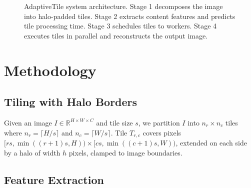 \documentclass[acmsmall]{acmart}
\begin{document}
\begin{figure}[t]
  \caption{AdaptiveTile system architecture. Stage 1 decomposes the image into halo-padded tiles. Stage 2 extracts content features and predicts tile processing time. Stage 3 schedules tiles to workers. Stage 4 executes tiles in parallel and reconstructs the output image.}
  \label{fig:architecture}
\end{figure}

\section{Methodology}
\label{sec:methodology}

\subsection{Tiling with Halo Borders}

Given an image $I \in \mathbb{R}^{H \times W \times C}$ and tile size $s$, we partition $I$ into $n_r \times n_c$ tiles where $n_r = \lceil H/s \rceil$ and $n_c = \lceil W/s \rceil$. Tile $T_{r,c}$ covers pixels $[rs, \min((r+1)s, H)) \times [cs, \min((c+1)s, W))$, extended on each side by a halo of width $h$ pixels, clamped to image boundaries. %

\subsection{Feature Extraction}
\end{document}
